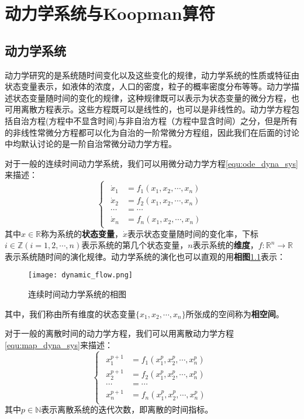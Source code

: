\chapter{动力学系统与Koopman算符}

\section{动力学系统}
动力学研究的是系统随时间变化以及这些变化的规律\cite{liuyanqing2000non}，动力学系统的性质或特征由状态变量表示，如液体的浓度，人口的密度，粒子的概率密度分布等等。动力学描述状态变量随时间的变化的规律，这种规律既可以表示为状态变量的微分方程，也可用离散方程表示。这些方程既可以是线性的，也可以是非线性的。动力学方程包括自治方程(方程中不显含时间)与非自治方程（方程中显含时间）之分，但是所有的非线性常微分方程都可以化为自治的一阶常微分方程组\cite{strogatz2001nonlinear}，因此我们在后面的讨论中均默认讨论的是一阶自治常微分动力学方程。

对于一般的连续时间动力学系统，我们可以用微分动力学方程\eqref{equ:ode_dyna_sys}来描述：
\begin{equation}
    \begin{cases}
        \begin{aligned}
            \dot{x}_1 &= f_1(x_1,x_2,\cdots,x_n)\\
            \dot{x}_2 &= f_2(x_1,x_2,\cdots,x_n)\\
            \cdots &= \cdots \\
            \dot{x}_n &= f_n(x_1,x_2,\cdots,x_n)
        \end{aligned}
    \end{cases}\label{equ:ode_dyna_sys}
\end{equation}
其中$x\in \mathbb{R}$称为系统的\textbf{状态变量}，$\dot{x}$表示状态变量随时间的变化率，下标$i\in \mathbb{Z}(i=1,2,\cdots,n)$表示系统的第几个状态变量，$n$表示系统的\textbf{维度}，$f:\mathbb{R}^n\rightarrow\mathbb{R}$表示系统随时间的演化规律。动力学系统的演化也可以直观的用\textbf{相图}\ref{fig:pha_spa}表示：
\begin{figure}
	\centering
	\texttt{[image: dynamic\_flow.png]}
    \caption{连续时间动力学系统的相图}
    \label{fig:pha_spa}
\end{figure}
其中，我们称由所有维度的状态变量$\{x_1,x_2,\cdots,x_n\}$所张成的空间称为\textbf{相空间}。

对于一般的离散时间的动力学方程，我们可以用离散动力学方程\eqref{equ:map_dyna_sys}来描述：
\begin{equation}
    \begin{cases}
        \begin{aligned}
            x_1^{p+1} &= f_1(x_1^p,x_2^p,\cdots,x_n^p)\\
            x_2^{p+1} &= f_2(x_1^p,x_2^p,\cdots,x_n^p)\\
            \cdots &= \cdots \\
            x_n^{p+1} &= f_n(x_1^p,x_2^p,\cdots,x_n^p)
        \end{aligned}
    \end{cases}\label{equ:map_dyna_sys}
\end{equation}
其中$p\in \mathbb{N}$表示离散系统的迭代次数，即离散的时间指标。


